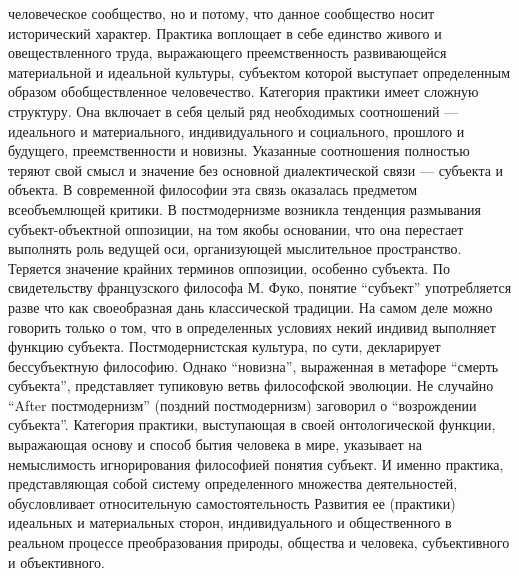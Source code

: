 \documentclass[12pt]{article}
\begin{document}
человеческое сообщество, но и потому, что данное сообщество носит исторический характер. Практика
воплощает в себе единство живого и овеществленного труда, выражающего преемственность развивающейся
материальной и идеальной культуры, субъектом которой выступает определенным образом обобществленное
человечество.
Категория практики имеет сложную структуру. Она включает в себя целый ряд необходимых соотношений —
идеального и материального, индивидуального и социального, прошлого и будущего, преемственности и
новизны. Указанные соотношения полностью теряют свой смысл и значение без основной диалектической
связи — субъекта и объекта.
В современной философии эта связь оказалась предметом всеобъемлющей критики. В постмодернизме
возникла тенденция размывания субъект-объектной оппозиции, на том якобы основании, что она перестает
выполнять роль ведущей оси, организующей мыслительное пространство. Теряется значение крайних терминов
оппозиции, особенно субъекта. По свидетельству французского философа М. Фуко, понятие “субъект”
употребляется разве что как своеобразная дань классической традиции. На самом деле можно говорить только о
том, что в определенных условиях некий индивид выполняет функцию субъекта. Постмодернистская культура,
по сути, декларирует бессубъектную философию. Однако “новизна”, выраженная в метафоре “смерть субъекта”,
представляет тупиковую ветвь философской эволюции. Не случайно “After постмодернизм” (поздний
постмодернизм) заговорил о “возрождении субъекта”.
Категория практики, выступающая в своей онтологической функции, выражающая основу и способ бытия
человека в мире, указывает на немыслимость игнорирования философией понятия субъект. И именно практика,
представляющая собой систему определенного множества деятельностей, обусловливает относительную
самостоятельность Развития ее (практики) идеальных и материальных сторон, индивидуального и
общественного в реальном процессе преобразования природы, общества и человека, субъективного и
объективного.
\end{document}
